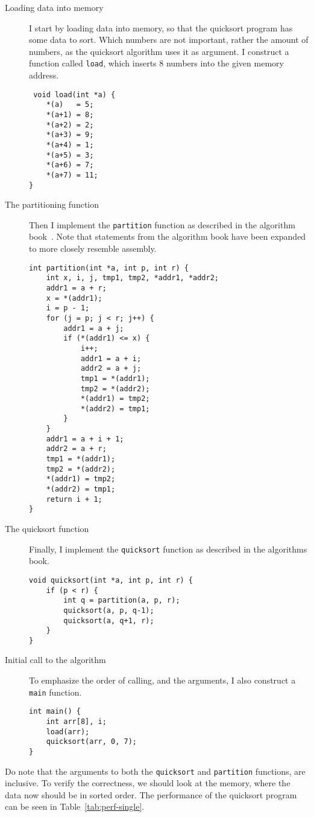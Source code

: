 \begin{description}
    \item[Loading data into memory] I start by loading data into memory, so
        that the quicksort program has some data to sort. Which numbers are not
        important, rather the amount of numbers, as the quicksort algorithm
        uses it as argument. I construct a function called \texttt{load}, which
        inserts 8 numbers into the given memory address.
        \lstset{language=[ANSI]C}
        \begin{lstlisting}
 void load(int *a) {
    *(a)   = 5;
    *(a+1) = 8;
    *(a+2) = 2;
    *(a+3) = 9;
    *(a+4) = 1;
    *(a+5) = 3;
    *(a+6) = 7;
    *(a+7) = 11;
}\end{lstlisting}

    \item[The partitioning function] Then I implement the \texttt{partition}
        function as described in the algorithm book~\cite{ref:alg}. Note that
        statements from the algorithm book have been expanded to more closely
        resemble assembly.
\newpage
\begin{lstlisting}
int partition(int *a, int p, int r) {
    int x, i, j, tmp1, tmp2, *addr1, *addr2;
    addr1 = a + r;
    x = *(addr1);
    i = p - 1;
    for (j = p; j < r; j++) {
        addr1 = a + j;
        if (*(addr1) <= x) {
            i++;
            addr1 = a + i;
            addr2 = a + j;
            tmp1 = *(addr1);
            tmp2 = *(addr2);
            *(addr1) = tmp2;
            *(addr2) = tmp1;
        }
    }
    addr1 = a + i + 1;
    addr2 = a + r;
    tmp1 = *(addr1);
    tmp2 = *(addr2);
    *(addr1) = tmp2;
    *(addr2) = tmp1;
    return i + 1;
}
\end{lstlisting}

    \item[The quicksort function] Finally, I implement the
        \texttt{quicksort} function as described in the algorithms book.
\begin{lstlisting}
void quicksort(int *a, int p, int r) {
    if (p < r) {
        int q = partition(a, p, r);
        quicksort(a, p, q-1);
        quicksort(a, q+1, r);
    }
}
\end{lstlisting}

    \item[Initial call to the algorithm] To emphasize the order of calling, and
        the arguments, I also construct a \texttt{main} function.
\begin{lstlisting}
int main() {
    int arr[8], i;
    load(arr);
    quicksort(arr, 0, 7);
}
\end{lstlisting}
\end{description}
Do note that the arguments to both the \texttt{quicksort} and
\texttt{partition} functions, are inclusive. To verify the correctness, we
should look at the memory, where the data now should be in sorted order. The
performance of the quicksort program can be seen in Table~\ref{tab:perf-single}.

